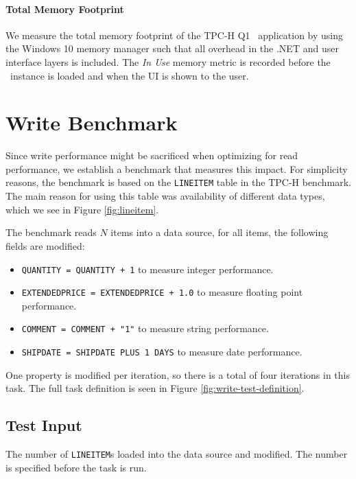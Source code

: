 \paragraph{Total Memory Footprint}
\label{par:Total Memory Footprint}
We measure the total memory footprint of the TPC-H Q1 \gd~application by using the Windows 10 memory manager such that all overhead in the .NET and user interface layers is included. The \textit{In Use} memory metric is recorded before the \gd~instance is loaded and when the UI is shown to the user. 

\section{Write Benchmark}
\label{bm:write}
Since write performance might be sacrificed when optimizing for read performance, we establish a benchmark that measures this impact. For simplicity reasons, the benchmark is based on the \texttt{LINEITEM} table in the TPC-H benchmark. The main reason for using this table was availability of  different data types, which we see in Figure \ref{fig:lineitem}.

The benchmark reads $N$ items into a data source, for all items, the following fields are modified:
\begin{itemize}
    \item \texttt{QUANTITY = QUANTITY + 1} to measure integer performance.
    \item \texttt{EXTENDEDPRICE = EXTENDEDPRICE + 1.0} to measure floating point performance.
    \item \texttt{COMMENT = COMMENT + "1"} to measure string performance.
    \item \texttt{SHIPDATE = SHIPDATE PLUS 1 DAYS} to measure date performance.
\end{itemize}
One property is modified per iteration, so there is a total of four iterations in this task. The full task definition is seen in Figure \ref{fig:write-test-definition}.

\subsection{Test Input}
\label{sub:Test Input}
The number of \texttt{LINEITEM}s loaded into the data source and modified. The number is specified before the task is run.

